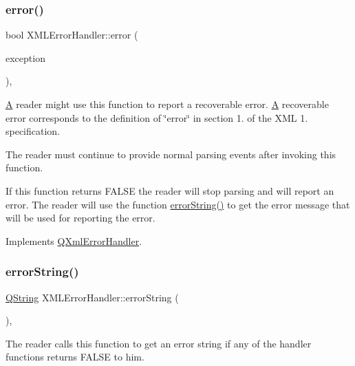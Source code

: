 \subsubsection{\texorpdfstring{error()}{error()}}
{\footnotesize\ttfamily bool X\+M\+L\+Error\+Handler\+::error (\begin{DoxyParamCaption}\item[{const \mbox{\hyperlink{class_q_xml_parse_exception}{Q\+Xml\+Parse\+Exception}} \&}]{exception }\end{DoxyParamCaption})\hspace{0.3cm}{\ttfamily [inline]}, {\ttfamily [virtual]}}

\mbox{\hyperlink{class_a}{A}} reader might use this function to report a recoverable error. \mbox{\hyperlink{class_a}{A}} recoverable error corresponds to the definition of \char`\"{}error\char`\"{} in section 1. of the X\+ML 1. specification.

The reader must continue to provide normal parsing events after invoking this function.

If this function returns F\+A\+L\+SE the reader will stop parsing and will report an error. The reader will use the function \mbox{\hyperlink{class_x_m_l_error_handler_ac8884161fa6aa0624f42ec57b04a66bb}{error\+String()}} to get the error message that will be used for reporting the error. 

Implements \mbox{\hyperlink{class_q_xml_error_handler_aa7e25c4198fa16a0312fd48e5718217c}{Q\+Xml\+Error\+Handler}}.

\mbox{\label{class_x_m_l_error_handler_ac8884161fa6aa0624f42ec57b04a66bb}} 
\subsubsection{\texorpdfstring{errorString()}{errorString()}}
{\footnotesize\ttfamily \mbox{\hyperlink{class_q_string}{Q\+String}} X\+M\+L\+Error\+Handler\+::error\+String (\begin{DoxyParamCaption}{ }\end{DoxyParamCaption})\hspace{0.3cm}{\ttfamily [inline]}, {\ttfamily [virtual]}}

The reader calls this function to get an error string if any of the handler functions returns F\+A\+L\+SE to him. 

